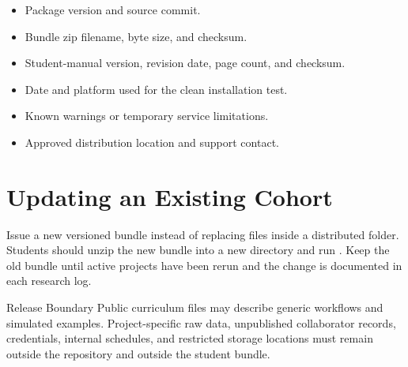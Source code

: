 \begin{itemize}
  \item Package version and source commit.
  \item Bundle zip filename, byte size, and checksum.
  \item Student-manual version, revision date, page count, and checksum.
  \item Date and platform used for the clean installation test.
  \item Known warnings or temporary service limitations.
  \item Approved distribution location and support contact.
\end{itemize}

\section{Updating an Existing Cohort}
Issue a new versioned bundle instead of replacing files inside a distributed
folder. Students should unzip the new bundle into a new directory and run
. Keep the old bundle until active projects
have been rerun and the change is documented in each research log.

\begin{goldbox}{Release Boundary}
Public curriculum files may describe generic workflows and simulated examples.
Project-specific raw data, unpublished collaborator records, credentials,
internal schedules, and restricted storage locations must remain outside the
repository and outside the student bundle.
\end{goldbox}
